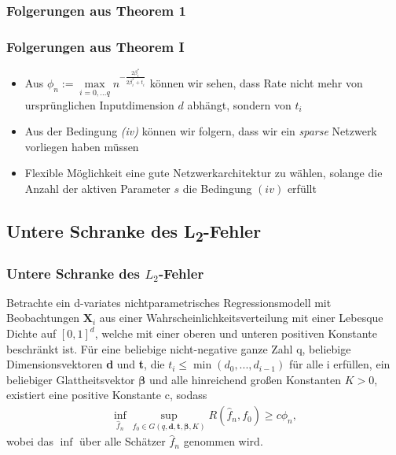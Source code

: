\documentclass[hyperref={pdfpagelabels=false}]{beamer}
\begin{document}
\subsubsection{Folgerungen aus Theorem 1}
\begin{frame}
\frametitle{Folgerungen aus Theorem \RN{1}}
\begin{itemize}
\item Aus $\phi _n := \max \limits_{i=0,...q} n^{- \frac{2 \beta _i ^*}{2 \beta _i ^* + t_i}}$ können wir sehen, dass Rate nicht mehr von ursprünglichen Inputdimension $d$ abhängt, sondern von $t_i$
\item Aus der Bedingung \textit{(iv)} können wir folgern, dass wir ein \textit{sparse} Netzwerk vorliegen haben müssen
\item Flexible Möglichkeit eine gute Netzwerkarchitektur zu wählen, solange die Anzahl der aktiven Parameter $s$ die Bedingung $(iv)$ erfüllt
\end{itemize}
\end{frame}



\subsection{Untere Schranke des L\textsubscript{2}-Fehler}
\begin{frame}
\frametitle{Untere Schranke des $L_2$-Fehler}
\begin{thm} \label{thm zusatz}
Betrachte ein d-variates nichtparametrisches Regressionsmodell mit Beobachtungen $\mathbf{X}_i$ aus einer Wahrscheinlichkeitsverteilung mit einer Lebesque Dichte auf $[0,1]^d$, welche mit einer oberen und unteren positiven Konstante beschränkt ist. Für eine beliebige nicht-negative ganze Zahl q, beliebige Dimensionsvektoren \textbf{d} und \textbf{t}, die $t_i \leq \min (d_0,..., d_{i-1})$ für alle i erfüllen, ein beliebiger Glattheitsvektor $\boldsymbol{\beta}$ und alle hinreichend großen Konstanten $K > 0$, existiert eine positive Konstante c, sodass 
\begin{align*}
\inf_{\widehat{f}_n} \sup_{f_0 \in G(q,\mathbf{d},\mathbf{t}, \boldsymbol{\beta}, K)} R(\widehat{f}_n, f_0) \geq c \phi_n,
\end{align*}
wobei das $\inf$ über alle Schätzer $\widehat{f}_n$ genommen wird.
\end{thm}
\end{frame}
\end{document}
